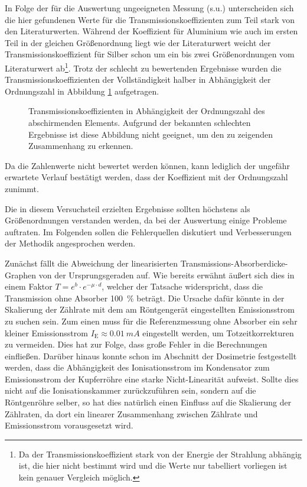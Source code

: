 \documentclass[11pt, a4paper]{article}
\numberwithin{equation}{section}
\begin{document}
In Folge der für die Auswertung ungeeigneten Messung (s.u.) unterscheiden sich die hier gefundenen Werte für die Transmissionskoeffizienten zum Teil stark von den Literaturwerten.
Während der Koeffizient für Aluminium wie auch im ersten Teil in der gleichen Größenordnung liegt wie der Literaturwert weicht der Transmissionskoeffizient für Silber schon um ein bis zwei Größenordnungen vom Literaturwert ab\footnote{Da der Transmissionskoeffizient stark von der Energie der Strahlung abhängig ist, die hier nicht bestimmt wird und die Werte nur tabelliert vorliegen ist kein genauer Vergleich möglich.}.
Trotz der schlecht zu bewertenden Ergebnisse wurden die Transmissionskoeffizienten der Vollständigkeit halber in Abhängigkeit der Ordnungszahl in Abbildung \ref{fig:scheiss_messung} aufgetragen.
\begin{figure}[ht]
	\centering
	
	\caption{Transmissionskoeffizienten in Abhängigkeit der Ordnungszahl des abschirmenden Elements.  Aufgrund der bekannten schlechten Ergebnisse ist diese Abbildung nicht geeignet, um den zu zeigenden Zusammenhang zu erkennen.}
	\label{fig:scheiss_messung}
\end{figure}
Da die Zahlenwerte nicht bewertet werden können, kann lediglich der ungefähr erwartete Verlauf bestätigt werden, dass der Koeffizient mit der Ordnungszahl zunimmt.

Die in diesem Versuchsteil erzielten Ergebnisse sollten höchstens als Größenordnungen verstanden werden, da bei der Auswertung einige Probleme auftraten.
Im Folgenden sollen die Fehlerquellen diskutiert und Verbesserungen der Methodik angesprochen werden.

Zunächst fällt die Abweichung der linearisierten Transmissions-Absorberdicke-Graphen von der Ursprungsgeraden auf.
Wie bereits erwähnt äußert sich dies in einem Faktor $T = e^b \cdot e^{-\mu \cdot d}$, welcher der Tatsache widerspricht, dass die Transmission ohne Absorber \SI{100}{\percent} beträgt.
Die Ursache dafür könnte in der Skalierung der Zählrate mit dem am Röntgengerät eingestellten Emissionsstrom zu suchen sein.
Zum einen muss für die Referenzmessung ohne Absorber ein sehr kleiner Emissionsstrom $I_\mathrm{E} \approx \SI{0.01}{mA}$ eingestellt werden, um Totzeitkorrekturen zu vermeiden.
Dies hat zur Folge, dass große Fehler in die Berechnungen einfließen.
Darüber hinaus konnte schon im Abschnitt der Dosimetrie festgestellt werden, dass die Abhängigkeit des Ionisationsstrom im Kondensator zum Emissionsstrom der Kupferröhre eine starke Nicht-Linearität aufweist.
Sollte dies nicht auf die Ionisationskammer zurückzuführen sein, sondern auf die Röntgenröhre selber, so hat dies natürlich einen Einfluss auf die Skalierung der Zählraten, da dort ein linearer Zusammenhang zwischen Zählrate und Emissionsstrom vorausgesetzt wird.
\end{document}
